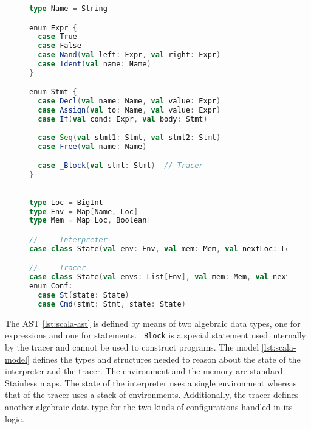 \begin{figure}[!h]
  \begin{minipage}{0.46\textwidth}
    \centering
    \begin{lstlisting}[language=scala, caption={AST structures defined in Scala},label={lst:scala-ast},frame=none,escapechar=*,basicstyle=\tt\scriptsize]
type Name = String

enum Expr {
  case True
  case False
  case Nand(val left: Expr, val right: Expr)
  case Ident(val name: Name)
}

enum Stmt {
  case Decl(val name: Name, val value: Expr)
  case Assign(val to: Name, val value: Expr)
  case If(val cond: Expr, val body: Stmt)
  
  case Seq(val stmt1: Stmt, val stmt2: Stmt)
  case Free(val name: Name)

  case _Block(val stmt: Stmt)  // Tracer
}
\end{lstlisting}
  \end{minipage}
  \begin{minipage}{0.54\textwidth}
    \centering
    \begin{lstlisting}[language=Scala, caption={Definition of models in Scala},label={lst:scala-model},frame=none,escapechar=*,basicstyle=\tt\scriptsize]

type Loc = BigInt
type Env = Map[Name, Loc]
type Mem = Map[Loc, Boolean]

// --- Interpreter ---
case class State(val env: Env, val mem: Mem, val nextLoc: Loc)

// --- Tracer ---
case class State(val envs: List[Env], val mem: Mem, val nextLoc: Loc)
enum Conf:
  case St(state: State)
  case Cmd(stmt: Stmt, state: State)

\end{lstlisting}
  \end{minipage}
\end{figure}


The AST \ref{lst:scala-ast} is defined by means of two algebraic data types, one for expressions and one for statements. \texttt{_Block} is a special statement used internally by the tracer and cannot be used to construct programs. The model \ref{lst:scala-model} defines the types and structures needed to reason about the state of the interpreter and the tracer. The environment and the memory are standard Stainless maps. The state of the interpreter uses a single environment whereas that of the tracer uses a stack of environments. Additionally, the tracer defines another algebraic data type for the two kinds of configurations handled in its logic.

